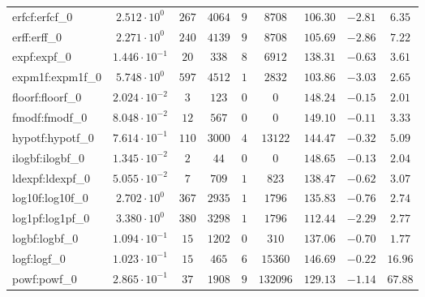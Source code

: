 \begin{tabular}{|l|c|c|c|c|c|c|c|c|}
erfcf:erfcf\_0               & $ 2.512 \cdot 10^{0}  $ & $ 267    $ & $ 4064   $ & $ 9   $ & $ 8708   $ & $ 106.30      $ & $ -2.81   $ & $ 6.35    $ \\
erff:erff\_0                 & $ 2.271 \cdot 10^{0}  $ & $ 240    $ & $ 4139   $ & $ 9   $ & $ 8708   $ & $ 105.69      $ & $ -2.86   $ & $ 7.22    $ \\
expf:expf\_0                 & $ 1.446 \cdot 10^{-1} $ & $ 20     $ & $ 338    $ & $ 8   $ & $ 6912   $ & $ 138.31      $ & $ -0.63   $ & $ 3.61    $ \\
expm1f:expm1f\_0             & $ 5.748 \cdot 10^{0}  $ & $ 597    $ & $ 4512   $ & $ 1   $ & $ 2832   $ & $ 103.86      $ & $ -3.03   $ & $ 2.65    $ \\
floorf:floorf\_0             & $ 2.024 \cdot 10^{-2} $ & $ 3      $ & $ 123    $ & $ 0   $ & $ 0      $ & $ 148.24      $ & $ -0.15   $ & $ 2.01    $ \\
fmodf:fmodf\_0               & $ 8.048 \cdot 10^{-2} $ & $ 12     $ & $ 567    $ & $ 0   $ & $ 0      $ & $ 149.10      $ & $ -0.11   $ & $ 3.33    $ \\
hypotf:hypotf\_0             & $ 7.614 \cdot 10^{-1} $ & $ 110    $ & $ 3000   $ & $ 4   $ & $ 13122  $ & $ 144.47      $ & $ -0.32   $ & $ 5.09    $ \\
ilogbf:ilogbf\_0             & $ 1.345 \cdot 10^{-2} $ & $ 2      $ & $ 44     $ & $ 0   $ & $ 0      $ & $ 148.65      $ & $ -0.13   $ & $ 2.04    $ \\
ldexpf:ldexpf\_0             & $ 5.055 \cdot 10^{-2} $ & $ 7      $ & $ 709    $ & $ 1   $ & $ 823    $ & $ 138.47      $ & $ -0.62   $ & $ 3.07    $ \\
log10f:log10f\_0             & $ 2.702 \cdot 10^{0}  $ & $ 367    $ & $ 2935   $ & $ 1   $ & $ 1796   $ & $ 135.83      $ & $ -0.76   $ & $ 2.74    $ \\
log1pf:log1pf\_0             & $ 3.380 \cdot 10^{0}  $ & $ 380    $ & $ 3298   $ & $ 1   $ & $ 1796   $ & $ 112.44      $ & $ -2.29   $ & $ 2.77    $ \\
logbf:logbf\_0               & $ 1.094 \cdot 10^{-1} $ & $ 15     $ & $ 1202   $ & $ 0   $ & $ 310    $ & $ 137.06      $ & $ -0.70   $ & $ 1.77    $ \\
logf:logf\_0                 & $ 1.023 \cdot 10^{-1} $ & $ 15     $ & $ 465    $ & $ 6   $ & $ 15360  $ & $ 146.69      $ & $ -0.22   $ & $ 16.96   $ \\
powf:powf\_0                 & $ 2.865 \cdot 10^{-1} $ & $ 37     $ & $ 1908   $ & $ 9   $ & $ 132096 $ & $ 129.13      $ & $ -1.14   $ & $ 67.88   $ \\

\end{tabular}
